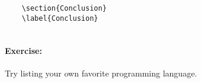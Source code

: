 \begin{verbatim}
    \section{Conclusion}
    \label{Conclusion}
    
\end{verbatim}

        \paragraph{Exercise:} Try listing your own favorite programming language.
